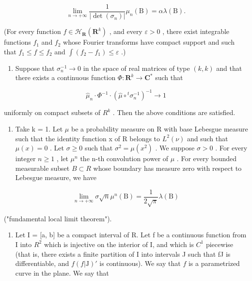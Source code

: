 \[
\lim _ {n \to + \infty} \frac {1}{| \det (\sigma_ {n}) |} \mu_ {n} (\mathrm{B}) = \alpha \lambda (\mathrm{B}).
\]

(For every function \(f \in \mathcal{H}_{\mathbf{R}}(\mathbf{R}^k)\) , and every \(\varepsilon > 0\) , there exist integrable functions \(f_1\) and \(f_2\) whose Fourier transforms have compact support and such that \(f_1 \leqslant f \leqslant f_2\) and \(\int (f_2 - f_1) \leqslant \varepsilon\) .)

\begin{enumerate}
\def\labelenumi{\alph{enumi})}
\setcounter{enumi}{2}
\tightlist
\item
  Suppose that \(\sigma_{n}^{-1}\to 0\) in the space of real matrices of type \((k,k)\) and that there exists a continuous function \(\Phi \colon \mathbf{R}^k\to \mathbf{C}^*\) such that
\end{enumerate}

\[
\widehat {\mu} _ {n} \cdot \Phi^ {- 1} \cdot (\widehat {\mu} \circ {} ^ {t} \sigma_ {n} ^ {- 1}) ^ {- 1} \to 1
\]

uniformly on compact subsets of \(R^{k}\) . Then the above conditions are satisfied.

\begin{enumerate}
\def\labelenumi{\alph{enumi})}
\setcounter{enumi}{3}
\tightlist
\item
  Take k = 1. Let \(\mu\) be a probability measure on R with base Lebesgue measure such that the identity function x of R belongs to \(L^{2}(\nu)\) and such that \(\mu(x) = 0\) . Let \(\sigma \geqslant 0\) such that \(\sigma^{2} = \mu(x^{2})\) . We suppose \(\sigma > 0\) . For every integer \(n \geqslant 1\) , let \(\mu^{n}\) the n-th convolution power of \(\mu\) . For every bounded measurable subset \(B \subset R\) whose boundary has measure zero with respect to Lebesgue measure, we have
\end{enumerate}

\[
\lim _ {n \rightarrow + \infty} \sigma \sqrt {n} \mu^ {n} (\mathrm{B}) = \frac {1}{2 \sqrt {\pi}} \lambda (\mathrm{B})
\]

("fundamental local limit theorem").

\begin{enumerate}
\def\labelenumi{\arabic{enumi})}
\setcounter{enumi}{43}
\tightlist
\item
  Let I = {[}a, b{]} be a compact interval of R. Let f be a continuous function from I into \(R^{2}\) which is injective on the interior of I, and which is \(C^{1}\) piecewise (that is, there exists a finite partition of I into intervals J such that f\textbar J is differentiable, and \(f(f|\mathrm{J})'\) is continuous). We say that \(f\) is a parametrized curve in the plane. We say that
\end{enumerate}

